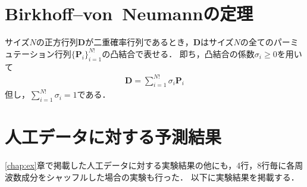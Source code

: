 \chapter{Birkhoff--von~Neumannの定理}
\label{vonNeumann}
サイズ$N$の正方行列$\bm{D}$が二重確率行列であるとき，$\bm{D}$はサイズ$N$の全てのパーミュテーション行列$\{\bm{P}_i\}_{i=1}^{N!}$の凸結合で表せる．
即ち，凸結合の係数$\sigma_i \geq 0$を用いて
\begin{align}
    \bm{D} = \sum_{i=1}^{N!} \sigma_i \bm{P}_i
\end{align}
但し，$\sum_{i=1}^{N!} \sigma_i = 1$である．
\chapter{人工データに対する予測結果}
\label{chap:artificial}

\ref{chap:ex}章で掲載した人工データに対する実験結果の他にも，4行，8行毎に各周波数成分をシャッフルした場合の実験も行った．
以下に実験結果を掲載する．

